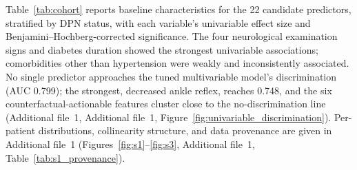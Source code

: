 \documentclass[pdflatex,sn-mathphys-num]{sn-jnl}%
\theoremstyle{thmstyleone}%
\theoremstyle{thmstyletwo}%
\theoremstyle{thmstylethree}%
\begin{document}
Table~\ref{tab:cohort} reports baseline characteristics for the 22 candidate predictors, stratified
by DPN status, with each variable's univariable effect size and Benjamini--Hochberg-corrected
significance. The four neurological examination signs and diabetes duration showed the strongest
univariable associations; comorbidities other than hypertension were weakly and inconsistently
associated. No single predictor approaches the tuned multivariable model's discrimination (AUC
0.799); the strongest, decreased ankle reflex, reaches 0.748, and the six counterfactual-actionable
features cluster close to the no-discrimination line (Additional file~1,
Additional file~1, Figure~\ref{fig:univariable_discrimination}). Per-patient distributions, collinearity structure, and
data provenance are given in Additional file~1
(Figures~\ref{fig:s1}--\ref{fig:s3}, Additional file~1, Table~\ref{tab:s1_provenance}).
\end{document}

